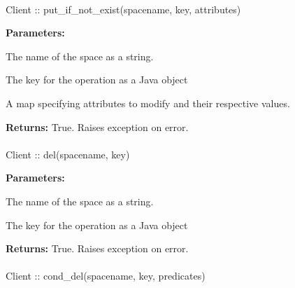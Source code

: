\paragraph{}
\label{api:java:put_if_not_exist}
\begin{javacode}
Client :: put_if_not_exist(spacename, key, attributes)
\end{javacode}


\noindent\textbf{Parameters:}
\begin{description}[labelindent=\widthof{{\code{attributes}}},leftmargin=*,noitemsep,nolistsep,align=right]
\item[\code{spacename}] The name of the space as a string.
\item[\code{key}] The key for the operation as a Java object
\item[\code{attributes}] A map specifying attributes to modify and their respective values.
\end{description}

\noindent\textbf{Returns:}
True.  Raises exception on error.

\paragraph{}
\label{api:java:del}
\begin{javacode}
Client :: del(spacename, key)
\end{javacode}


\noindent\textbf{Parameters:}
\begin{description}[labelindent=\widthof{{\code{spacename}}},leftmargin=*,noitemsep,nolistsep,align=right]
\item[\code{spacename}] The name of the space as a string.
\item[\code{key}] The key for the operation as a Java object
\end{description}

\noindent\textbf{Returns:}
True.  Raises exception on error.

\paragraph{}
\label{api:java:cond_del}
\begin{javacode}
Client :: cond_del(spacename, key, predicates)
\end{javacode}


